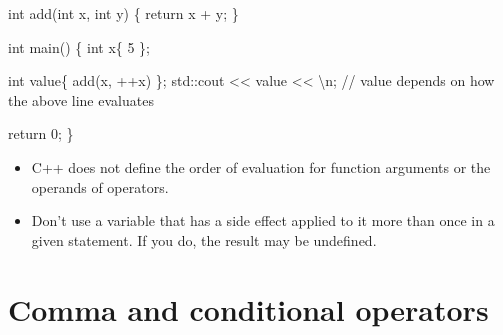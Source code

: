 \documentclass[
  letterpaper,
  DIV=11,
  numbers=noendperiod]{scrreprt}
\newenvironment{Shaded}{\begin{snugshade}}{\end{snugshade}}
\newcommand{\DecValTok}[1]{\textcolor[rgb]{0.68,0.00,0.00}{#1}}
\newcommand{\ErrorTok}[1]{\textcolor[rgb]{0.68,0.00,0.00}{#1}}
\newcommand{\FunctionTok}[1]{\textcolor[rgb]{0.28,0.35,0.67}{#1}}
\newcommand{\NormalTok}[1]{\textcolor[rgb]{0.00,0.23,0.31}{#1}}
\newcommand{\SpecialCharTok}[1]{\textcolor[rgb]{0.37,0.37,0.37}{#1}}
\newcommand{\StringTok}[1]{\textcolor[rgb]{0.13,0.47,0.30}{#1}}
\begin{document}
\begin{Shaded}
\begin{Highlighting}[]
\NormalTok{int }\FunctionTok{add}\NormalTok{(int x, int y)}
\NormalTok{\{}
\NormalTok{    return x }\SpecialCharTok{+}\NormalTok{ y;}
\NormalTok{\}}

\NormalTok{int }\FunctionTok{main}\NormalTok{()}
\NormalTok{\{}
\NormalTok{    int x\{ }\DecValTok{5}\NormalTok{ \};}
    
\NormalTok{    int value\{ }\FunctionTok{add}\NormalTok{(x, }\SpecialCharTok{++}\NormalTok{x) \};}
\NormalTok{    std}\SpecialCharTok{::}\NormalTok{cout }\SpecialCharTok{\textless{}}\ErrorTok{\textless{}}\NormalTok{ value }\SpecialCharTok{\textless{}}\ErrorTok{\textless{}} \StringTok{\textquotesingle{}}\SpecialCharTok{\textbackslash{}n}\StringTok{\textquotesingle{}}\NormalTok{; }\SpecialCharTok{/}\ErrorTok{/}\NormalTok{ value depends on how the above line evaluates}

\NormalTok{    return }\DecValTok{0}\NormalTok{;}
\NormalTok{\}}
\end{Highlighting}
\end{Shaded}

\begin{tcolorbox}[enhanced jigsaw, toprule=.15mm, rightrule=.15mm, opacityback=0, breakable, leftrule=.75mm, colback=white, colframe=quarto-callout-warning-color-frame, arc=.35mm, left=2mm, bottomrule=.15mm]
\begin{minipage}[t]{5.5mm}
\textcolor{quarto-callout-warning-color}{\faExclamationTriangle}
\end{minipage}%
\begin{minipage}[t]{\textwidth - 5.5mm}

\begin{itemize}
\item
  C++ does not define the order of evaluation for function arguments or
  the operands of operators.
\item
  Don't use a variable that has a side effect applied to it more than
  once in a given statement. If you do, the result may be undefined.
\end{itemize}

\end{minipage}%
\end{tcolorbox}

\hypertarget{comma-and-conditional-operators}{%
\section{Comma and conditional
operators}\label{comma-and-conditional-operators}}
\end{document}
